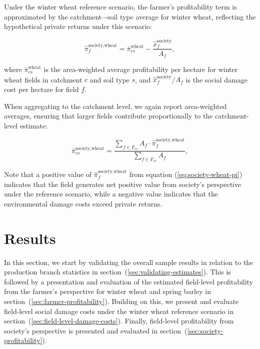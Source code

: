 \documentclass[12pt]{article}
\begin{document}
Under the winter wheat reference scenario, 
the farmer's profitability term is approximated by the catchment–-soil type average for winter wheat, reflecting the hypothetical private returns under this scenario:

\begin{equation}
    \hat{\pi}_{f}^{\text{society,wheat}} = \bar{\pi}_{cs}^{\text{wheat}}
    - \frac{\hat{x}_{f}^{\text{society}}}{A_{f}},
    \label{eq:society-wheat-pi}
\end{equation}

where $\bar{\pi}_{cs}^{\text{wheat}}$ is the area-weighted average profitability per hectare for winter wheat fields in catchment $c$ and
soil type $s$, and $\hat{x}_{f}^{\text{society}} / A_{f}$ is the social damage cost per hectare for field $f$.

When aggregating to the catchment level, we again report area-weighted averages, ensuring that larger fields contribute proportionally to the catchment-level estimate:

\begin{equation}
    \bar{\pi}_{cs}^{\text{society,wheat}} =
    \frac{\sum_{f \in F_{cs}} A_{f} \cdot
    \hat{\pi}_{f}^{\text{society,wheat}}}{\sum_{f \in F_{cs}} A_{f}},
\end{equation}


Note that a positive value of $\hat{\pi}_{f}^{\text{society,wheat}} $ from equation (\ref{eq:society-wheat-pi}) indicates that the field generates net positive value from society's perspective under the reference scenario, while a negative value indicates that
the environmental damage costs exceed private returns.



\section{Results}
\label{sec:results}
In this section, we start by validating the overall sample results in relation to the production branch statistics in section~(\ref{sec:validating-estimates}). 
This is followed by a presentation and evaluation of the estimated field-level profitability from the farmer's perspective for winter wheat and spring barley in section~(\ref{sec:farmer-profitability}).
Building on this, we present and evaluate field-level social damage costs under the winter wheat reference scenario in section~(\ref{sec:field-level-damage-costs}).
Finally, field-level profitability from society's perspective is presented and evaluated in section~(\ref{sec:society-profitability}).
\end{document}
